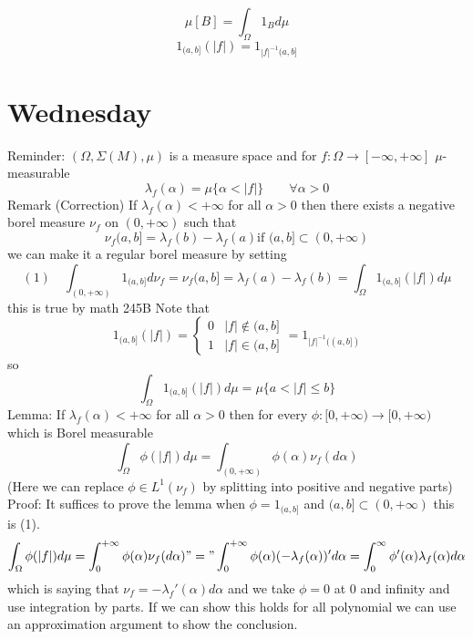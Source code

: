 \documentclass[11pt]{article}
\begin{document}
\[
    \mu[B] = \int_{\Omega}^{}1_B d \mu
\] 
\[
    1_{(a,b]}(|f|) = 1_{|f|^{-1}(a,b]}
\] 

\section{Wednesday}

Reminder: $(\Omega, \Sigma (M), \mu)$ is a measure space and for $f : \Omega \to [-\infty, +\infty]$ $\mu$-measurable
\[
    \lambda_f(\alpha) = \mu\{\alpha < |f| \} \qquad \forall \alpha > 0
\] 
Remark (Correction) If $\lambda_f(\alpha) < +\infty$ for all $\alpha > 0$ then there exists a negative borel measure
$\nu_f$ on  $(0,+\infty)$ such that
\[
    \nu_f(a,b] = \lambda_f(b) - \lambda_f(a) \text{if $(a,b] \subset (0,+\infty)$}
\] 
we can make it a regular borel measure by setting
\[
    (1) \quad   \int_{(0,+\infty)}^{}1_{(a,b]}d \nu_f = \nu_f(a,b] = \lambda_f(a) - \lambda_f(b) =  \int_{\Omega}^{}1_{(a,b]}(|f|) d \mu
\] 
this is true by math 245B
Note that
\[
    1_{(a,b]}(|f|) =
    \begin{cases}
        0 & |f| \not\in (a,b]\\
        1 & |f| \in (a,b]
    \end{cases}
    = 1_{|f|^{-1}((a,b])}
\] 
so
\[
    \int_{\Omega}^{}1_{(a,b]}(|f|)d \mu = \mu \{a < |f| \le b\}
\] 
Lemma: If $\lambda_f(\alpha) < +\infty$ for all $\alpha > 0$ then  for every $\phi: [0,+\infty) \to [0, +\infty)$ which is Borel measurable
\[
\int_{\Omega}^{}\phi(|f|) d \mu = \int_{(0,+\infty)}^{}\phi(\alpha) \nu_f(d \alpha) 
\] 
(Here we can replace $\phi \in L^{1}(\nu_f)$ by splitting into positive and negative parts)
Proof: It suffices to prove the lemma when $\phi = 1_{(a,b]}$ and $(a,b] \subset (0,+\infty)$ this is (1).
\[
\int_{\Omega}^{}\phi(|f|) d \mu = \int_{0}^{+\infty}\phi(\alpha) \nu_f(d \alpha) "=" \int_{0}^{+\infty} \phi(\alpha) (-\lambda_f(\alpha))' d \alpha =  \int_{0}^{\infty} \phi'(\alpha) \lambda_f(\alpha) d \alpha
\] 
which is saying that $\nu_f = -\lambda_f'(\alpha) d \alpha$ and we take $\phi = 0$ at 0 and infinity and use integration by parts.
If we can show this holds for all polynomial we can use an approximation argument to show the conclusion.
\end{document}
